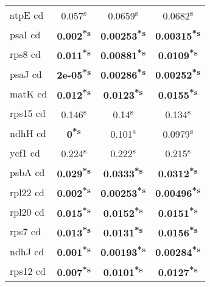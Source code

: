 \documentclass[a4paper]{article}
\begin{document}
\begin{longtable}{l|c|c|c}
atpE cd&0.057\textsuperscript{s}&0.0659\textsuperscript{s}&0.0682\textsuperscript{s}\\
psaI cd&\textbf{0.002\textsuperscript{*}\textsuperscript{s}}&\textbf{0.00253\textsuperscript{*}\textsuperscript{s}}&\textbf{0.00315\textsuperscript{*}\textsuperscript{s}}\\
rps8 cd&\textbf{0.011\textsuperscript{*}\textsuperscript{s}}&\textbf{0.00881\textsuperscript{*}\textsuperscript{s}}&\textbf{0.0109\textsuperscript{*}\textsuperscript{s}}\\
psaJ cd&\textbf{2e-05\textsuperscript{*}\textsuperscript{s}}&\textbf{0.00286\textsuperscript{*}\textsuperscript{s}}&\textbf{0.00252\textsuperscript{*}\textsuperscript{s}}\\
matK cd&\textbf{0.012\textsuperscript{*}\textsuperscript{s}}&\textbf{0.0123\textsuperscript{*}\textsuperscript{s}}&\textbf{0.0155\textsuperscript{*}\textsuperscript{s}}\\
rps15 cd&0.146\textsuperscript{s}&0.14\textsuperscript{s}&0.134\textsuperscript{s}\\
ndhH cd&\textbf{0\textsuperscript{*}\textsuperscript{s}}&0.101\textsuperscript{s}&0.0979\textsuperscript{s}\\
ycf1 cd&0.224\textsuperscript{s}&0.222\textsuperscript{s}&0.215\textsuperscript{s}\\
psbA cd&\textbf{0.029\textsuperscript{*}\textsuperscript{s}}&\textbf{0.0333\textsuperscript{*}\textsuperscript{s}}&\textbf{0.0312\textsuperscript{*}\textsuperscript{s}}\\
rpl22 cd&\textbf{0.002\textsuperscript{*}\textsuperscript{s}}&\textbf{0.00253\textsuperscript{*}\textsuperscript{s}}&\textbf{0.00496\textsuperscript{*}\textsuperscript{s}}\\
rpl20 cd&\textbf{0.015\textsuperscript{*}\textsuperscript{s}}&\textbf{0.0152\textsuperscript{*}\textsuperscript{s}}&\textbf{0.0151\textsuperscript{*}\textsuperscript{s}}\\
rps7 cd&\textbf{0.013\textsuperscript{*}\textsuperscript{s}}&\textbf{0.0131\textsuperscript{*}\textsuperscript{s}}&\textbf{0.0156\textsuperscript{*}\textsuperscript{s}}\\
ndhJ cd&\textbf{0.001\textsuperscript{*}\textsuperscript{s}}&\textbf{0.00193\textsuperscript{*}\textsuperscript{s}}&\textbf{0.00284\textsuperscript{*}\textsuperscript{s}}\\
rps12 cd&\textbf{0.007\textsuperscript{*}\textsuperscript{s}}&\textbf{0.0101\textsuperscript{*}\textsuperscript{s}}&\textbf{0.0127\textsuperscript{*}\textsuperscript{s}}\\

\end{longtable}
\end{document}
